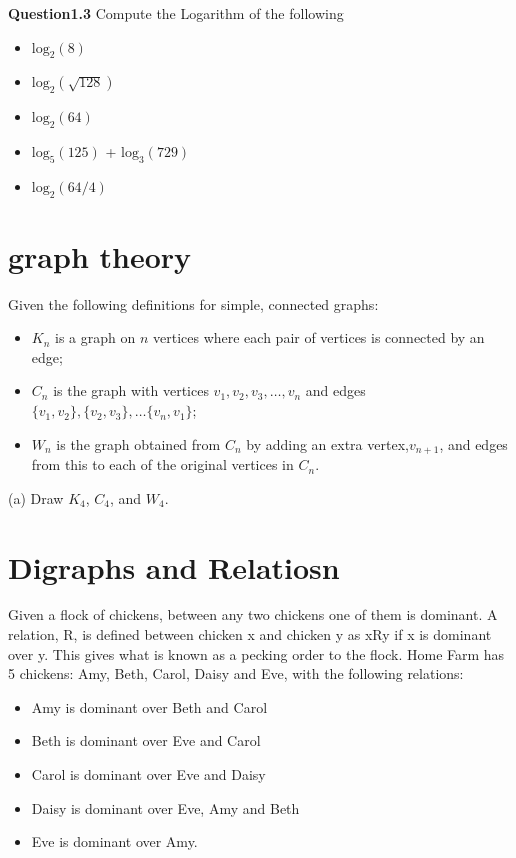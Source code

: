 \documentclass[12pt]{article} %
\begin{document}
\noindent \textbf{Question1.3} Compute the Logarithm of the following
\begin{itemize}
\item $\mbox{log}_2(8)$
\item $\mbox{log}_2(\sqrt{128})$
\item $\mbox{log}_2(64)$
\item $\mbox{log}_5(125)$ +   $\mbox{log}_3(729)$
\item $\mbox{log}_2(64/4)$
\end{itemize}
\section{graph theory }
Given the following definitions for simple, connected graphs:
\begin{itemize}
\item $K_n$ is a graph on $n$ vertices where each pair of vertices is connected by an edge;
\item $C_n$ is the graph with vertices $v_1, v_2, v_3, \dots, v_n$ and edges $\{v_1,v_2\}, \{v_2,v_3\}, \dots\{v_n, v_1\}$;
\item $W_n$ is the graph obtained from $C_n$ by adding an extra vertex,$v_{n+1}$, and edges
from this to each of the original vertices in $C_n$.
\end{itemize}
(a) Draw $K_4$, $C_4$, and $W_4$. 
\newpage
\section{Digraphs and Relatiosn}
Given a flock of chickens, between any two chickens one of them is
dominant. A relation, R, is defined between chicken x and chicken y as xRy if x is
dominant over y. This gives what is known as a pecking order to the flock. Home
Farm has 5 chickens: Amy, Beth, Carol, Daisy and Eve, with the following relations:

\begin{itemize}
\item Amy is dominant over Beth and Carol
\item Beth is dominant over Eve and Carol
\item Carol is dominant over Eve and Daisy
\item Daisy is dominant over Eve, Amy and Beth
\item Eve is dominant over Amy.
\end{itemize}
\end{document}
